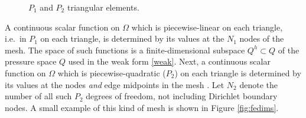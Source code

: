 \documentclass[letterpaper,final,12pt,reqno]{amsart}
\begin{document}
\begin{figure}[ht]
\caption{$P_1$ and $P_2$ triangular elements.}
\label{fig:fedofs}
\end{figure}

A continuous scalar function on $\Omega$ which is piecewise-linear on each triangle, i.e.~in $P_1$ on each triangle, is determined by its values at the $N_1$ nodes of the mesh.  The space of such functions is a finite-dimensional subspace $Q^h \subset Q$ of the pressure space $Q$ used in the weak form \eqref{weak}.  Next, a continuous scalar function on $\Omega$ which is piecewise-quadratic ($P_2$) on each triangle is determined by its values at the nodes \emph{and} edge midpoints in the mesh \cite{Elmanetal2014}.  Let $N_2$ denote the number of all such $P_2$ degrees of freedom, not including Dirichlet boundary nodes.  A small example of this kind of mesh is shown in Figure \ref{fig:fedims}.
\end{document}
